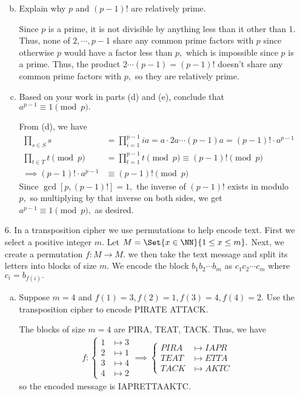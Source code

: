 \documentclass{article}
\begin{document}
\begin{itemize}
\begin{enumerate}[(a)]
				\newpage
			\item Explain why $p$ and $(p-1)!$ are relatively prime.
				\begin{answer*}
					Since $p$ is a prime, it is not divisible by anything less than it other than 1. Thus, none of $2, \cdots, p-1$ share any common prime factors with $p$ since otherwise $p$ would have a factor less than $p,$ which is impossible since $p$ is a prime. Thus, the product $2\cdots (p-1)=(p-1)!$ doesn't share any common prime factors with $p,$ so they are relatively prime.
				\end{answer*}

			\item Based on your work in parts (d) and (e), conclude that $a^{p-1}\equiv 1\pmod p.$
				\begin{soln}
					From (d), we have
					\begin{align*}
						\prod_{s\in S}^{}s &= \prod_{i=1}^{p-1} ia = a\cdot 2a\cdots (p-1)a = (p-1)! \cdot a^{p-1} \\
						\prod_{t\in T}^{}t \pmod p &= \prod_{t=1}^{p-1} t \pmod p \equiv (p-1)!\pmod p \\
						\implies (p-1)! \cdot a^{p-1} &\equiv (p-1)!\pmod p
					\end{align*}
					Since $\gcd\left[ p, (p-1)! \right]=1,$ the inverse of $(p-1)!$ exists in modulo $p,$ so multiplying by that inverse on both sides, we get $a^{p-1}\equiv 1\pmod p,$ as desired.
				\end{soln}
				
		\end{enumerate}

	\item[6.] In a transposition cipher we use permutations to help encode text. First we select a positive integer $m.$ Let $M=\Set{x\in\NN}{1\le x\le m}.$ Next, we create a permutation $f:M\to M.$ we then take the text message and split its letters into blocks of size $m.$ We encode the block $b_1b_2\cdots b_m$ as $c_1c_2\cdots c_m$ where $c_i=b_{f(i)}.$ 
		\begin{enumerate}[(a)]
			\item Suppose $m=4$ and $f(1)=3, f(2)=1, f(3)=4, f(4)=2.$ Use the transposition cipher to encode PIRATE ATTACK.
				\begin{soln}
					The blocks of size $m=4$ are PIRA, TEAT, TACK. Thus, we have
					\begin{align*}
						f:\begin{cases}
							1 &\mapsto 3 \\
							2 &\mapsto 1 \\
							3 &\mapsto 4 \\
							4 &\mapsto 2
						\end{cases} \implies \begin{cases}
							PIRA &\mapsto IAPR \\
							TEAT &\mapsto ETTA \\
							TACK &\mapsto AKTC
						\end{cases}
					\end{align*}
					so the encoded message is IAPRETTAAKTC.
				\end{soln}


\end{enumerate}
\end{itemize}
\end{document}
